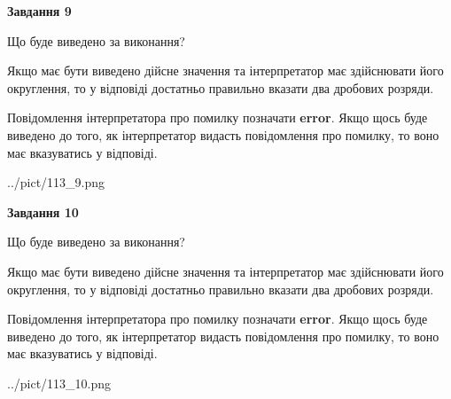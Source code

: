 \documentclass[12pt, ukrainian]{article}
\begin{document}
{\begin {Large}
{\begin {center}\textbf{Завдання 9}\end {center}}\par
Що буде виведено за виконання? \par

Якщо має бути виведено дійсне значення та інтерпретатор має здійснювати його округлення, 
то у відповіді достатньо правильно вказати два дробових розряди.

Повідомлення інтерпретатора про помилку позначати \textbf{error}.
Якщо щось буде виведено до того, як інтерпретатор видасть повідомлення про помилку, 
то воно має вказуватись у відповіді. \par

\begin{center}
	{../pict/113_9.png}
\end{center}
\newpage

{\begin {center}\textbf{Завдання 10}\end {center}}\par
Що буде виведено за виконання? \par

Якщо має бути виведено дійсне значення та інтерпретатор має здійснювати його округлення, 
то у відповіді достатньо правильно вказати два дробових розряди.

Повідомлення інтерпретатора про помилку позначати \textbf{error}.
Якщо щось буде виведено до того, як інтерпретатор видасть повідомлення про помилку, 
то воно має вказуватись у відповіді. \par

\begin{center}
	{../pict/113_10.png}
\end{center}
\newpage

\end {Large}}
\end{document}
